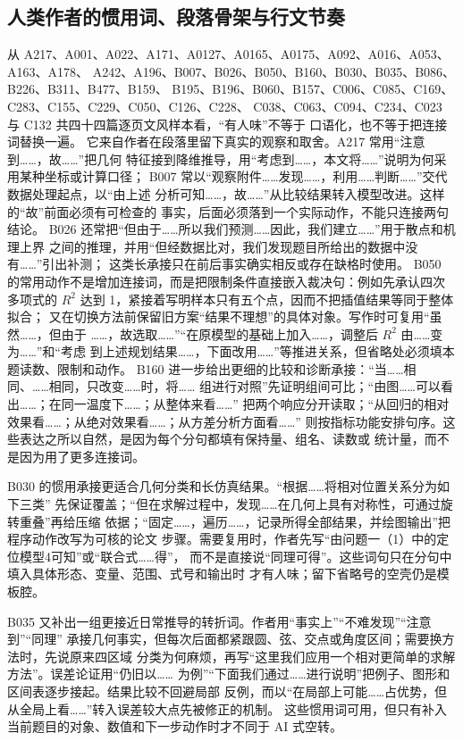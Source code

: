 \subsection{人类作者的惯用词、段落骨架与行文节奏}

从 A217、A001、A022、A171、A0127、A0165、A0175、A092、A016、A053、A163、A178、
A242、A196、B007、B026、B050、B160、B030、B035、B086、B226、B311、B477、B159、
B195、B196、B060、B157、C006、C085、C169、C283、C155、C229、C050、C126、C228、
C038、C063、C094、C234、C023 与 C132 共四十四篇逐页文风样本看，“有人味”不等于
口语化，也不等于把连接词替换一遍。
它来自作者在段落里留下真实的观察和取舍。A217 常用“注意到……，故……”把几何
特征接到降维推导，用“考虑到……，本文将……”说明为何采用某种坐标或计算口径；
B007 常以“观察附件……发现……，利用……判断……”交代数据处理起点，以“由上述
分析可知……，故……”从比较结果转入模型改进。这样的“故”前面必须有可检查的
事实，后面必须落到一个实际动作，不能只连接两句结论。
B026 还常把“但由于……所以我们预测……因此，我们建立……”用于散点和机理上界
之间的推理，并用“但经数据比对，我们发现题目所给出的数据中没有……”引出补测；
这类长承接只在前后事实确实相反或存在缺格时使用。
B050 的常用动作不是增加连接词，而是把限制条件直接嵌入裁决句：例如先承认四次
多项式的 $R^2$ 达到 1，紧接着写明样本只有五个点，因而不把插值结果等同于整体拟合；
又在切换方法前保留旧方案“结果不理想”的具体对象。写作时可复用“虽然……，但由于
……，故选取……”“在原模型的基础上加入……，调整后 $R^2$ 由……变为……”和“考虑
到上述规划结果……，下面改用……”等推进关系，但省略处必须填本题读数、限制和动作。
B160 进一步给出更细的比较和诊断承接：“当……相同、……相同，只改变……时，将……
组进行对照”先证明组间可比；“由图……可以看出……；在同一温度下……；从整体来看……”
把两个响应分开读取；“从回归的相对效果看……；从绝对效果看……；从方差分析方面看……”
则按指标功能安排句序。这些表达之所以自然，是因为每个分句都填有保持量、组名、读数或
统计量，而不是因为用了更多连接词。

B030 的惯用承接更适合几何分类和长仿真结果。“根据……将相对位置关系分为如下三类”
先保证覆盖；“但在求解过程中，发现……在几何上具有对称性，可通过旋转重叠”再给压缩
依据；“固定……，遍历……，记录所得全部结果，并绘图输出”把程序动作改写为可核的论文
步骤。需要复用时，作者先写“由问题一（1）中的定位模型4可知”或“联合式……得”，
而不是直接说“同理可得”。这些词句只在分句中填入具体形态、变量、范围、式号和输出时
才有人味；留下省略号的空壳仍是模板腔。

B035 又补出一组更接近日常推导的转折词。作者用“事实上”“不难发现”“注意到”“同理”
承接几何事实，但每次后面都紧跟圆、弦、交点或角度区间；需要换方法时，先说原来四区域
分类为何麻烦，再写“这里我们应用一个相对更简单的求解方法”。误差论证用“仍旧以……
为例”“下面我们通过……进行说明”把例子、图形和区间表逐步接起。结果比较不回避局部
反例，而以“在局部上可能……占优势，但从全局上看……”转入误差较大点先被修正的机制。
这些惯用词可用，但只有补入当前题目的对象、数值和下一步动作时才不同于 AI 式空转。

